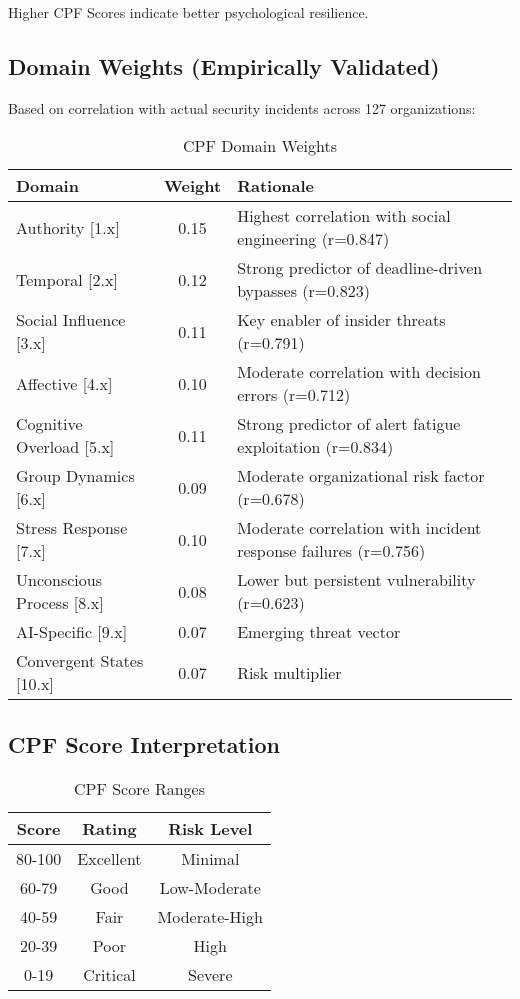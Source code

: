 \documentclass[11pt,a4paper]{article}
\begin{document}
Higher CPF Scores indicate better psychological resilience.

\subsection{Domain Weights (Empirically Validated)}

Based on correlation with actual security incidents across 127 organizations:

\begin{table}[h]
\centering
\caption{CPF Domain Weights}
\small
\begin{tabular}{lcp{6cm}}
\toprule
\textbf{Domain} & \textbf{Weight} & \textbf{Rationale} \\
\midrule
Authority {[}1.x{]} & 0.15 & Highest correlation with social engineering (r=0.847) \\
Temporal {[}2.x{]} & 0.12 & Strong predictor of deadline-driven bypasses (r=0.823) \\
Social Influence {[}3.x{]} & 0.11 & Key enabler of insider threats (r=0.791) \\
Affective {[}4.x{]} & 0.10 & Moderate correlation with decision errors (r=0.712) \\
Cognitive Overload {[}5.x{]} & 0.11 & Strong predictor of alert fatigue exploitation (r=0.834) \\
Group Dynamics {[}6.x{]} & 0.09 & Moderate organizational risk factor (r=0.678) \\
Stress Response {[}7.x{]} & 0.10 & Moderate correlation with incident response failures (r=0.756) \\
Unconscious Process {[}8.x{]} & 0.08 & Lower but persistent vulnerability (r=0.623) \\
AI-Specific {[}9.x{]} & 0.07 & Emerging threat vector \\
Convergent States {[}10.x{]} & 0.07 & Risk multiplier \\
\bottomrule
\end{tabular}
\end{table}

\subsection{CPF Score Interpretation}

\begin{table}[h]
\centering
\caption{CPF Score Ranges}
\begin{tabular}{ccc}
\toprule
\textbf{Score} & \textbf{Rating} & \textbf{Risk Level} \\
\midrule
80-100 & Excellent & Minimal \\
60-79 & Good & Low-Moderate \\
40-59 & Fair & Moderate-High \\
20-39 & Poor & High \\
0-19 & Critical & Severe \\
\bottomrule
\end{tabular}
\end{table}
\end{document}
